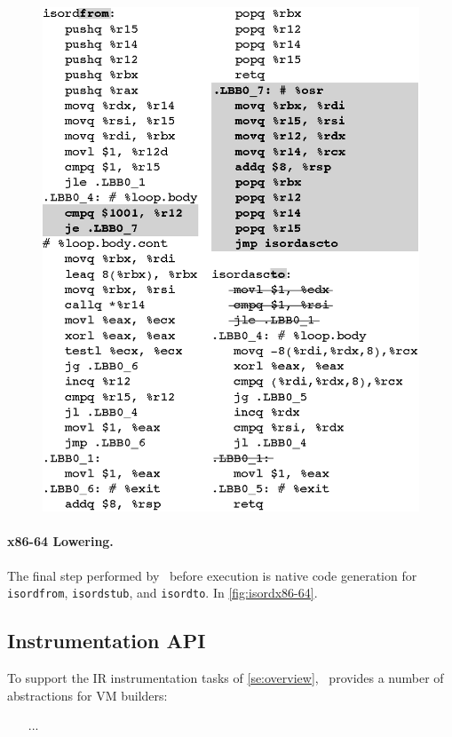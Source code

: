 \ifdefined\noauthorea
\begin{figure}[t]
\begin{center}
\includegraphics[width=0.9\columnwidth]{figures/isordx86-64/isordx86-64.eps}
\caption{\protect}
\end{center}
\end{figure}
\fi

\paragraph{x86-64 Lowering.}
The final step performed by \tinyvm\ before execution is native code generation for {\tt isordfrom}, {\tt isordstub}, and {\tt isordto}. In \myfigure\ref{fig:isordx86-64}.

\subsection{Instrumentation API}
\label{se:instrum-api}
To support the IR instrumentation tasks of \mysection\ref{se:overview}, \tinyvm\ provides a number of abstractions for VM builders:
\begin{itemize}
\item [...]
\end{itemize}

